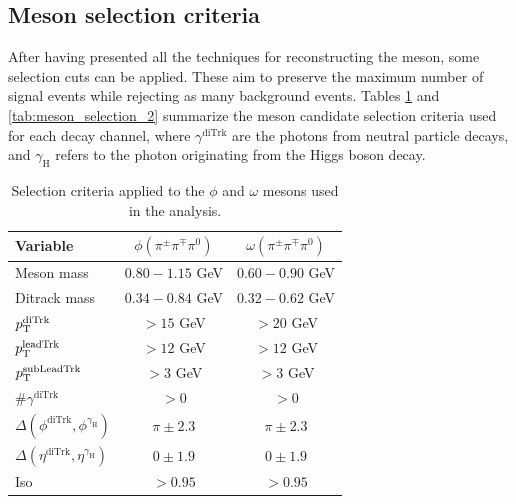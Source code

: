 \subsection{Meson selection criteria}\label{subsec:meson_selection}

After having presented all the techniques for reconstructing the meson, some selection cuts can be applied. These aim to preserve the maximum number of signal events while rejecting as many background events. Tables \ref{tab:meson_selection_1} and \ref{tab:meson_selection_2} summarize the meson candidate selection criteria used for each decay channel, where $\gamma^{\text{diTrk}}$ are the photons from neutral particle decays, and $\gamma_\text{H}$ refers to the photon originating from the Higgs boson decay.
\begin{table}[!ht]
    \centering
    \begin{tabular}{|l|c|c|}
        \hline
        \cellcolor{lightgray}Variable & \cellcolor{lightgray}$\phi(\pi^{\pm}\pi^{\mp}\pi^{0})$ & \cellcolor{lightgray}$\omega(\pi^{\pm}\pi^{\mp}\pi^{0})$ \\ \hline
        Meson mass                                              &$0.80-1.15$ GeV  &$0.60-0.90$ GeV    \\
        Ditrack mass                                            &$0.34-0.84$ GeV  &$0.32-0.62$ GeV      \\
        $p_\text{T}^{\text{diTrk}}$                                    &$>15$ GeV        &$>20$ GeV              \\
        $p_\text{T}^{\text{leadTrk}}$                                  &$>12$ GeV        &$>12$ GeV               \\
        $p_\text{T}^{\text{subLeadTrk}}$                               &$>3$ GeV         &$>3$ GeV           \\
        $\#\gamma^{\text{diTrk}}$                               &$>0$             &$>0$                   \\
        $\Delta(\phi^{\text{diTrk}}, \phi^{\gamma_\text{H}})$   &$\pi\pm2.3$      &$\pi\pm2.3$        \\
        $\Delta(\eta^{\text{diTrk}}, \eta^{\gamma_\text{H}})$   &$0\pm1.9$        &$0\pm1.9$              \\
        Iso                                                     &$>0.95$          &$>0.95$                \\
        \hline
        \end{tabular}
    \caption{Selection criteria applied to the $\phi$ and $\omega$ mesons used in the analysis.}
    \label{tab:meson_selection_1}
\end{table}

